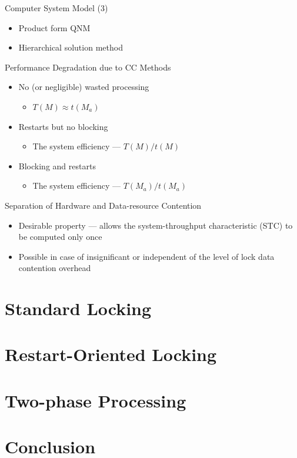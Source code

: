 \documentclass[sans]{beamer}
\begin{document}
\begin{frame}{Computer System Model (3)}
  \begin{itemize}
    \item Product form QNM
    \item Hierarchical solution method
  \end{itemize}
\end{frame}

\begin{frame}{Performance Degradation due to CC Methods}
  \begin{itemize}
    \item No (or negligible) wasted processing
      \begin{itemize}
        \item $T(M) \approx t(M_a)$
      \end{itemize}
    \item Restarts but no blocking
      \begin{itemize}
        \item The system efficiency --- $T(M) / t(M)$
      \end{itemize}
    \item Blocking and restarts
      \begin{itemize}
        \item The system efficiency --- $T(M_a) / t(M_a)$
      \end{itemize}
  \end{itemize}
\end{frame}

\begin{frame}{Separation of Hardware and Data-resource Contention}
  \begin{itemize}
    \item Desirable property --- allows the system-throughput characteristic (STC) to be computed only once
    \item Possible in case of insignificant or independent of the level of lock data contention overhead
  \end{itemize}
\end{frame}

\section{Standard Locking}

\section{Restart-Oriented Locking}

\section{Two-phase Processing}

\section{Conclusion}
\end{document}
